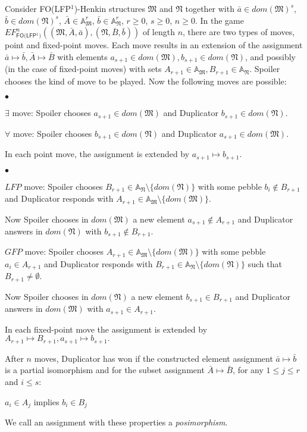 \documentclass{LMCS}
\newcommand{\frM}{\mathfrak{M}}
\newcommand{\frN}{\mathfrak{N}}
\newcommand{\folfp}{\textsf{FO(LFP$^1$)}\xspace}
\begin{document}
\begin{defi}[\folfp Ehrenfeucht-Fra\"\i ss\'e game]
Consider \folfp-Henkin structures $\frM$ and $\frN$ together with $\bar{a} \in dom(\frM)^s$,
$\bar{b} \in dom(\frN)^s$,  $\bar{A} \in \mathbb{A}_\frM^r$,
$\bar{b} \in \mathbb{A}_\frN^r$, $r \geq 0$, $s \geq 0$, $n \geq 0$. In the game
$EF_\folfp^n((\frM, \bar{A}, \bar{a}),(\frN, \bar{B}, \bar{b}))$ of length $n$,
there are two types of moves, point and fixed-point moves. Each
move results in an extension of the assignment $\bar{a} \mapsto \bar{b}, \bar{A}
\mapsto \bar{B}$ with elements $a_{s+1} \in dom(\frM), b_{s+1} \in
dom(\frN)$, and possibly (in the case of fixed-point moves) with
sets $A_{r+1} \in \mathbb{A}_\frM, B_{r+1} \in \mathbb{A}_\frN$. Spoiler chooses the kind of move to be played. 
Now the following moves are
possible:

\begin{iteMize}{$\bullet$}
\item{$\exists$ move: Spoiler chooses $a_{s+1} \in dom(\frM)$ and Duplicator $b_{s+1} \in dom(\frN)$.}
\item{$\forall$ move: Spoiler chooses $b_{s+1} \in dom(\frN)$ and Duplicator $a_{s+1} \in dom(\frM)$.}
\end{iteMize}
In each point move, the assignment is extended by $a_{s+1}\mapsto
b_{s+1}$.
\begin{iteMize}{$\bullet$}
\item{$LFP$ move: Spoiler chooses $B_{r+1} \in \mathbb{A}_{\frN} \setminus \{dom(\frN)\}$ with some pebble $b_i \not \in B_{r+1}$
and Duplicator responds with $A_{r+1} \in
\mathbb{A}_{\frM}\setminus \{dom(\frM)\}$.

Now Spoiler chooses in $dom(\frM)$ a new element $a_{s+1} \not \in
A_{r+1}$ and Duplicator answers in $dom(\frN)$ with $b_{s+1} \not \in
B_{r+1}.$}
\item{$GFP$ move:  Spoiler chooses $A_{r+1} \in \mathbb{A}_{\frM}\setminus \{dom(\frM)\}$ with some pebble $a_i \in A_{r+1}$
and Duplicator responds with $B_{r+1} \in
\mathbb{A}_{\frN}\setminus \{dom(\frN)\}$ such that $B_{r+1} \neq
\emptyset$.

Now Spoiler chooses in $dom(\frN)$ a new element $b_{s+1} \in B_{r+1}$ and
Duplicator answers in $dom(\frM)$ with $a_{s+1} \in A_{r+1}$.}
\end{iteMize}
In each fixed-point move the assignment is extended by $A_{r+1}
\mapsto B_{r+1}, a_{s+1} \mapsto b_{s+1}.$

After $n$ moves, Duplicator has won if the constructed element
assignment $\bar{a} \mapsto \bar{b}$ is a partial isomorphism and
for the subset assignment $\bar{A} \mapsto \bar{B}$, for any $1
\leq j \leq r$ and $i \leq s$:
\begin{center}
$a_i \in A_j$ implies $b_i \in B_j$
\end{center}
We call an assignment with these properties a \emph{posimorphism}.
\label{effolfp}
\end{defi}
\end{document}

